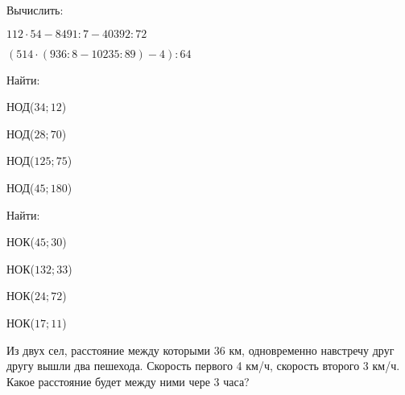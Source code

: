 \setlength\fboxrule{1.2pt}
\begin{listofex}
	\item Вычислить:
	\begin{enumcols}[itemcolumns=2]
		\item \( 112\cdot54-8491:7-40392:72 \)
		\item \( (514\cdot(936:8-10235:89)-4):64 \)
	\end{enumcols}
	\item Найти:
	\begin{enumcols}[itemcolumns=2]
		\item НОД(\( 34; 12 \))
		\item НОД(\( 28; 70 \))
		\item НОД(\( 125; 75 \))
		\item НОД(\( 45; 180 \))
	\end{enumcols}
	\item Найти:
	\begin{enumcols}[itemcolumns=2]
		\item НОК(\( 45; 30 \))
		\item НОК(\( 132; 33 \))
		\item НОК(\( 24; 72 \))
		\item НОК(\( 17; 11 \))
	\end{enumcols}
	\item Из двух сел, расстояние между которыми 36 км, одновременно навстречу друг другу вышли два пешехода. Скорость первого 4 км/ч, скорость второго 3 км/ч. Какое расстояние будет между ними чере 3 часа?
\end{listofex}